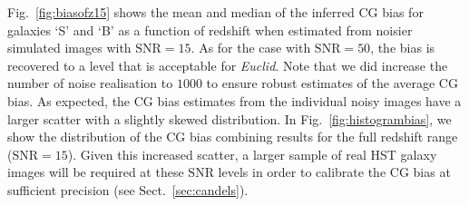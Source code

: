 \documentclass[useAMS,usenatbib]{mnras}
\begin{document}
Fig.~\ref{fig:biasofz15} shows the mean and median of the inferred CG bias for galaxies `S' and `B' as a function of redshift when estimated from noisier simulated images with \mbox{$\mathrm{SNR}=15$}. As for the case with \mbox{$\mathrm{SNR}=50$}, the bias is recovered to a level that is acceptable for {\it Euclid}. Note that we did increase the number of noise realisation to $1000$ to ensure robust estimates of the average CG bias. As expected, the CG bias estimates from the individual noisy images have a larger scatter with a slightly skewed distribution. In Fig.~\ref{fig:histogrambias}, we show the distribution of the CG bias combining results for the full redshift range (\mbox{$\mathrm{SNR}=15$}). Given this increased scatter, a larger sample of real HST galaxy images will be required at these \mbox{$\mathrm{SNR}$} levels in order to calibrate the CG bias at sufficient precision (see Sect.~\ref{sec:candels}).


\end{document}
